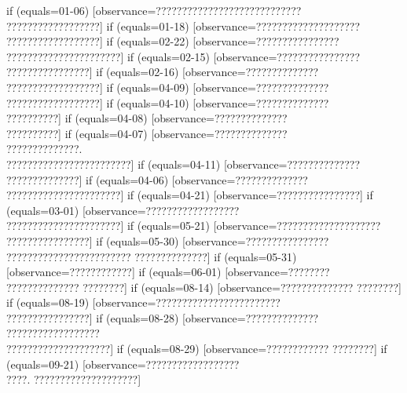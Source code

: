 {  if (equals=01-06) [observance=????????????????????????????\\ ??????????????????]
  if (equals=01-18) [observance=????????????????????\\ ??????????????????]
  if (equals=02-22) [observance=????????????????\\ ??????????????????????]
  if (equals=02-15) [observance=????????????????\\ ????????????????]
  if (equals=02-16) [observance=??????????????\\ ??????????????????]
  if (equals=04-09) [observance=??????????????\\ ??????????????????]
  if (equals=04-10) [observance=??????????????\\ ??????????]
  if (equals=04-08) [observance=??????????????\\ ??????????]
  if (equals=04-07) [observance=??????????????\\ ??????????????.\\ ????????????????????????]
  if (equals=04-11) [observance=??????????????\\ ??????????????]
  if (equals=04-06) [observance=??????????????\\ ??????????????????????]
  if (equals=04-21) [observance=????????????????]
  if (equals=03-01) [observance=??????????????????\\ ??????????????????????]
  if (equals=05-21) [observance=????????????????????\\ ????????????????]
  if (equals=05-30) [observance=????????????????\\ ???????????????????????? ??????????????]
  if (equals=05-31) [observance=????????????]
  if (equals=06-01) [observance=???????? ?????????????? ????????]
  if (equals=08-14) [observance=?????????????? ????????]
  if (equals=08-19) [observance=????????????????????????\\ ????????????????]
  if (equals=08-28) [observance=??????????????\\ ??????????????????\\ ????????????????????]
  if (equals=08-29) [observance=???????????? ????????]
  if (equals=09-21) [observance=??????????????????\\ ????. ????????????????????]
}
